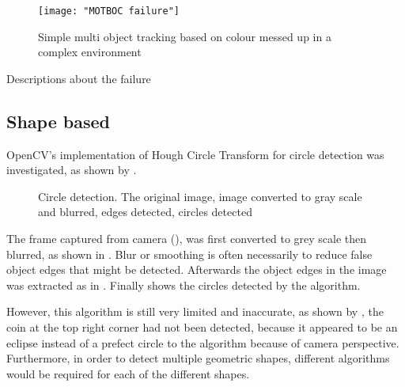 \begin{figure}[H]
  \centering
  \texttt{[image: "MOTBOC failure"]}
  \caption{Simple multi object tracking based on colour \cite{MOTBOC.git} messed up in a complex environment}
  \label{Figure:MOTBOC_F}
\end{figure}

{\color{red}Descriptions about the failure}

\subsection{Shape based}

OpenCV's implementation of Hough Circle Transform for circle detection was investigated, as shown by .


\begin{figure}[H]
  \centering
  \caption{Circle detection.  The original image,  image converted to gray scale and blurred,  edges detected,  circles detected}
  \label{Figure:circles}
\end{figure}

The frame captured from camera (), was first converted to grey scale then blurred, as shown in . Blur or smoothing is often necessarily to reduce false object edges that might be detected. Afterwards the object edges in the image was extracted as in . Finally  shows the circles detected by the algorithm.

However, this algorithm is still very limited and inaccurate, as shown by , the coin at the top right corner had not been detected, because it appeared to be an eclipse instead of a prefect circle to the algorithm because of camera perspective. Furthermore, in order to detect multiple geometric shapes, different algorithms would be required for each of the different shapes.

